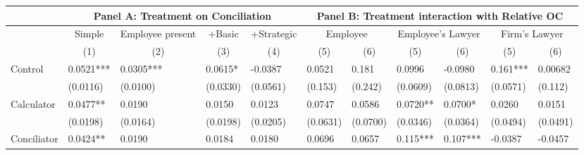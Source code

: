 \begin{tabular}{rrrrrrrrrrr}
\toprule
      & \multicolumn{4}{c}{Panel A: Treatment on Conciliation} & \multicolumn{6}{c}{Panel B: Treatment interaction with Relative OC} \\
\midrule
      & \multicolumn{1}{c}{Simple} & \multicolumn{1}{c}{Employee present} & \multicolumn{1}{c}{+Basic} & \multicolumn{1}{c}{+Strategic} & \multicolumn{2}{c}{Employee} & \multicolumn{2}{c}{Employee's Lawyer} & \multicolumn{2}{c}{Firm's Lawyer} \\
      & \multicolumn{1}{c}{(1)} & \multicolumn{1}{c}{(2)} & \multicolumn{1}{c}{(3)} & \multicolumn{1}{c}{(4)} & \multicolumn{1}{c}{(5)} & \multicolumn{1}{c}{(6)} & \multicolumn{1}{c}{(5)} & \multicolumn{1}{c}{(6)} & \multicolumn{1}{c}{(5)} & \multicolumn{1}{c}{(6)} \\
\multicolumn{1}{l}{Control} & \multicolumn{1}{l}{0.0521***} & \multicolumn{1}{l}{0.0305***} & \multicolumn{1}{l}{0.0615*} & \multicolumn{1}{l}{-0.0387} & \multicolumn{1}{l}{0.0521} & \multicolumn{1}{l}{0.181} & \multicolumn{1}{l}{0.0996} & \multicolumn{1}{l}{-0.0980} & \multicolumn{1}{l}{0.161***} & \multicolumn{1}{l}{0.00682} \\
\multicolumn{1}{l}{} & \multicolumn{1}{l}{(0.0116)} & \multicolumn{1}{l}{(0.0100)} & \multicolumn{1}{l}{(0.0330)} & \multicolumn{1}{l}{(0.0561)} & \multicolumn{1}{l}{(0.153)} & \multicolumn{1}{l}{(0.242)} & \multicolumn{1}{l}{(0.0609)} & \multicolumn{1}{l}{(0.0813)} & \multicolumn{1}{l}{(0.0571)} & \multicolumn{1}{l}{(0.112)} \\
\multicolumn{1}{l}{Calculator} & \multicolumn{1}{l}{0.0477**} & \multicolumn{1}{l}{0.0190} & \multicolumn{1}{l}{0.0150} & \multicolumn{1}{l}{0.0123} & \multicolumn{1}{l}{0.0747} & \multicolumn{1}{l}{0.0586} & \multicolumn{1}{l}{0.0720**} & \multicolumn{1}{l}{0.0700*} & \multicolumn{1}{l}{0.0260} & \multicolumn{1}{l}{0.0151} \\
\multicolumn{1}{l}{} & \multicolumn{1}{l}{(0.0198)} & \multicolumn{1}{l}{(0.0164)} & \multicolumn{1}{l}{(0.0198)} & \multicolumn{1}{l}{(0.0205)} & \multicolumn{1}{l}{(0.0631)} & \multicolumn{1}{l}{(0.0700)} & \multicolumn{1}{l}{(0.0346)} & \multicolumn{1}{l}{(0.0364)} & \multicolumn{1}{l}{(0.0494)} & \multicolumn{1}{l}{(0.0491)} \\
\multicolumn{1}{l}{Conciliator} & \multicolumn{1}{l}{0.0424**} & \multicolumn{1}{l}{0.0190} & \multicolumn{1}{l}{0.0184} & \multicolumn{1}{l}{0.0180} & \multicolumn{1}{l}{0.0696} & \multicolumn{1}{l}{0.0657} & \multicolumn{1}{l}{0.115***} & \multicolumn{1}{l}{0.107***} & \multicolumn{1}{l}{-0.0387} & \multicolumn{1}{l}{-0.0457} \\

\end{tabular}
